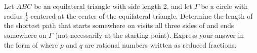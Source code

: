 Let $ ABC$ be an equilateral triangle with side length 2, and let $ \Gamma$ be a circle with radius $ \frac {1}{2}$ centered at the center of the equilateral triangle. Determine the length of the shortest path that starts somewhere on  visits all three sides of  and ends somewhere on $ \Gamma$ (not necessarily at the starting point). Express your answer in the form of  where $ p$ and $ q$ are rational numbers written as reduced fractions.